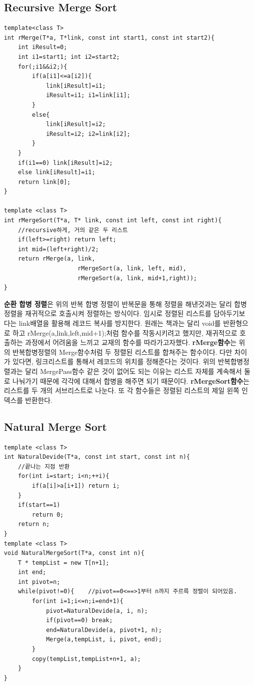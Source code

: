 \documentclass[a4paper,11pt]{article}
\begin{document}
\subsection{Recursive Merge Sort}
\begin{Verbatim}
template<class T>
int rMerge(T*a, T*link, const int start1, const int start2){
    int iResult=0;
    int i1=start1; int i2=start2;
    for(;i1&&i2;){
        if(a[i1]<=a[i2]){
            link[iResult]=i1;
            iResult=i1; i1=link[i1];
        }
        else{
            link[iResult]=i2;
            iResult=i2; i2=link[i2];
        }
    }
    if(i1==0) link[iResult]=i2;
    else link[iResult]=i1;
    return link[0];
}

template <class T>
int rMergeSort(T*a, T* link, const int left, const int right){
    //recursive하게, 거의 같은 두 리스트
    if(left>=right) return left;
    int mid=(left+right)/2;
    return rMerge(a, link,
                     rMergeSort(a, link, left, mid),
                     rMergeSort(a, link, mid+1,right));
}
\end{Verbatim}

\textbf{순환 합병 정렬}은 위의 반복 합병 정렬이 반복문을 통해 정렬을 해낸것과는 달리 합병정렬을 재귀적으로 호출시켜 정렬하는 방식이다. 임시로 정렬된 리스트를 담아두기보다는 link배열을 활용해 레코드 복사를 방지한다. 원래는 책과는 달리 void를 반환형으로 하고 rMerge(a,link,left,mid+1);처럼 함수를 작동시키려고 했지만, 재귀적으로 호출하는 과정에서 어려움을 느끼고 교재의 함수를 따라가고자했다. \textbf{rMerge함수}는 위의 반복합병정렬의 Merge함수처럼 두 정렬된 리스트를 합쳐주는 함수이다. 다만 차이가 있다면, 링크리스트를 통해서 레코드의 위치를 정해준다는 것이다. 위의 반복합병정렬과는 달리 MergePass함수 같은 것이 없어도 되는 이유는 리스트 자체를 계속해서 둘로 나눠가기 때문에 각각에 대해서 합병을 해주면 되기 때문이다. \textbf{rMergeSort함수}는 리스트를 두 개의 서브리스트로 나눈다. 또 각 함수들은 정렬된 리스트의 제일 왼쪽 인덱스를 반환한다.


\subsection{Natural Merge Sort}
\begin{Verbatim}
template <class T>
int NaturalDevide(T*a, const int start, const int n){
    //끝나는 지점 반환
    for(int i=start; i<n;++i){
        if(a[i]>a[i+1]) return i;
    }
    if(start==1)
        return 0;
    return n;
}
template <class T>
void NaturalMergeSort(T*a, const int n){
    T * tempList = new T[n+1];
    int end;    
    int pivot=n;
    while(pivot!=0){    //pivot==0<==>1부터 n까지 주르륵 정렬이 되어있음.
        for(int i=1;i<=n;i=end+1){
            pivot=NaturalDevide(a, i, n);
            if(pivot==0) break;
            end=NaturalDevide(a, pivot+1, n);
            Merge(a,tempList, i, pivot, end); 
        }
        copy(tempList,tempList+n+1, a);
    }
}
\end{Verbatim}
\end{document}
